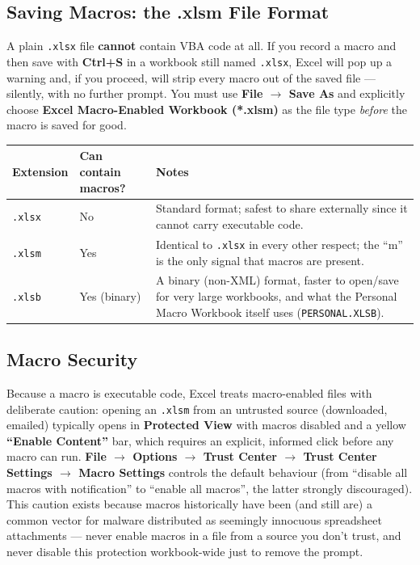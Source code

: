 \documentclass[11pt,a4paper]{article}
\begin{document}
\subsection{Saving Macros: the .xlsm File Format}

\begin{pitfall}
A plain \texttt{.xlsx} file \textbf{cannot} contain VBA code at all. If you record a macro and then save with \textbf{Ctrl+S} in a workbook still named \texttt{.xlsx}, Excel will pop up a warning and, if you proceed, will strip every macro out of the saved file --- silently, with no further prompt. You must use \textbf{File $\rightarrow$ Save As} and explicitly choose \textbf{Excel Macro-Enabled Workbook (*.xlsm)} as the file type \emph{before} the macro is saved for good.
\end{pitfall}

\begin{center}
\begin{tabular}{@{}L{2.6cm}L{4.6cm}L{5.2cm}@{}}
\toprule
\textbf{Extension} & \textbf{Can contain macros?} & \textbf{Notes} \\
\midrule
\texttt{.xlsx} & No & Standard format; safest to share externally since it cannot carry executable code. \\
\texttt{.xlsm} & Yes & Identical to \texttt{.xlsx} in every other respect; the ``m'' is the only signal that macros are present. \\
\texttt{.xlsb} & Yes (binary) & A binary (non-XML) format, faster to open/save for very large workbooks, and what the Personal Macro Workbook itself uses (\texttt{PERSONAL.XLSB}). \\
\bottomrule
\end{tabular}
\end{center}

\subsection{Macro Security}
\label{sec:macrosecurity}

Because a macro is executable code, Excel treats macro-enabled files with deliberate caution: opening an \texttt{.xlsm} from an untrusted source (downloaded, emailed) typically opens in \textbf{Protected View} with macros disabled and a yellow \textbf{``Enable Content''} bar, which requires an explicit, informed click before any macro can run. \textbf{File $\rightarrow$ Options $\rightarrow$ Trust Center $\rightarrow$ Trust Center Settings $\rightarrow$ Macro Settings} controls the default behaviour (from ``disable all macros with notification'' to ``enable all macros'', the latter strongly discouraged). This caution exists because macros historically have been (and still are) a common vector for malware distributed as seemingly innocuous spreadsheet attachments --- never enable macros in a file from a source you don't trust, and never disable this protection workbook-wide just to remove the prompt.
\end{document}
